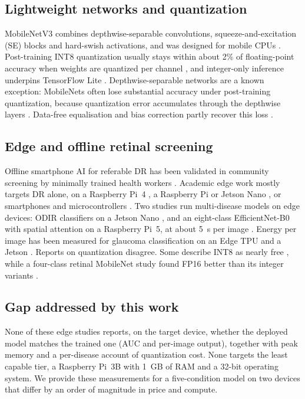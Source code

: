 \documentclass[a4paper,fleqn]{cas-sc}
\begin{document}
\subsection{Lightweight networks and quantization}
MobileNetV3 combines depthwise-separable convolutions, squeeze-and-excitation
(SE) blocks and hard-swish activations, and was designed for mobile CPUs
\cite{howard2019searching,hu2018squeeze,sandler2018mobilenetv2}.
Post-training INT8 quantization usually stays within about 2\% of
floating-point accuracy when weights are quantized per channel
\cite{krishnamoorthi2018quantizing,nagel2021white}, and integer-only
inference underpins TensorFlow Lite \cite{jacob2018quantization}.
Depthwise-separable networks are a known exception: MobileNets often lose
substantial accuracy under post-training quantization, because quantization
error accumulates through the depthwise layers
\cite{yun2021mobilenets,sheng2018quantization}. Data-free equalisation and
bias correction partly recover this loss \cite{nagel2019datafree}.

\subsection{Edge and offline retinal screening}
Offline smartphone AI for referable DR has been validated in community
screening by minimally trained health workers
\cite{natarajan2019diagnostic,sosale2020simple}. Academic edge work mostly
targets DR alone, on a Raspberry Pi~4 \cite{ajithkumar2025efficient}, a
Raspberry Pi or Jetson Nano \cite{kishore2026edge}, or smartphones and
microcontrollers \cite{asare2025deploying,nief2025highly}. Two studies run
multi-disease models on edge devices: ODIR classifiers on a Jetson Nano
\cite{aljbaar2023dcnn}, and an eight-class EfficientNet-B0 with spatial
attention on a Raspberry Pi~5, at about 5~s per image
\cite{thaware2025leveraging}. Energy per image has been measured for
glaucoma classification on an Edge TPU and a Jetson
\cite{rodriguezcorral2024energy}. Reports on quantization disagree. Some
describe INT8 as nearly free \cite{nief2025highly,abushaban2025optimizing},
while a four-class retinal MobileNet study found FP16 better than its
integer variants \cite{farah2026lightweight}.

\subsection{Gap addressed by this work}
None of these edge studies reports, on the target device, whether the
deployed model matches the trained one (AUC and per-image output),
together with peak memory and a per-disease account of quantization cost.
None targets the least capable tier, a Raspberry Pi~3B with 1~GB of RAM and
a 32-bit operating system. We provide these measurements for a
five-condition model on two devices that differ by an order of magnitude in
price and compute.
\end{document}
